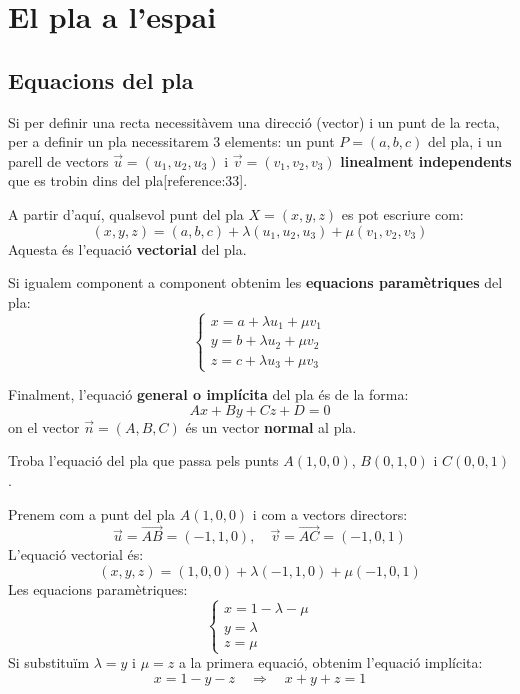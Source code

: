 \documentclass[12pt]{article}
\begin{document}
\section{El pla a l'espai}

\subsection{Equacions del pla}

\begin{concept}
Si per definir una recta necessitàvem una direcció (vector) i un punt de la recta, per a definir un pla necessitarem 3 elements: un punt $P=(a,b,c)$ del pla, i un parell de vectors $\vec{u}=(u_1,u_2,u_3)$ i $\vec{v}=(v_1,v_2,v_3)$ \textbf{linealment independents} que es trobin dins del pla[reference:33].

A partir d'aquí, qualsevol punt del pla $X=(x,y,z)$ es pot escriure com:
\[
\boxed{(x,y,z)=(a,b,c)+\lambda(u_1,u_2,u_3)+\mu(v_1,v_2,v_3)}
\]
Aquesta és l'equació \textbf{vectorial} del pla.

Si igualem component a component obtenim les \textbf{equacions paramètriques} del pla:
\[
\boxed{
\begin{cases}
x = a + \lambda u_1 + \mu v_1 \\
y = b + \lambda u_2 + \mu v_2 \\
z = c + \lambda u_3 + \mu v_3
\end{cases}
}
\]

Finalment, l'equació \textbf{general o implícita} del pla és de la forma:
\[
\boxed{Ax + By + Cz + D = 0}
\]
on el vector $\vec{n} = (A, B, C)$ és un vector \textbf{normal} al pla.
\end{concept}

\begin{exemple}
Troba l'equació del pla que passa pels punts $A(1,0,0)$, $B(0,1,0)$ i $C(0,0,1)$.

Prenem com a punt del pla $A(1,0,0)$ i com a vectors directors:
\[
\vec{u} = \overrightarrow{AB} = (-1,1,0), \quad \vec{v} = \overrightarrow{AC} = (-1,0,1)
\]
L'equació vectorial és:
\[
(x,y,z) = (1,0,0) + \lambda(-1,1,0) + \mu(-1,0,1)
\]
Les equacions paramètriques:
\[
\begin{cases}
x = 1 - \lambda - \mu \\
y = \lambda \\
z = \mu
\end{cases}
\]
Si substituïm $\lambda = y$ i $\mu = z$ a la primera equació, obtenim l'equació implícita:
\[
x = 1 - y - z \quad \Rightarrow \quad x + y + z = 1
\]
\end{exemple}
\end{document}
